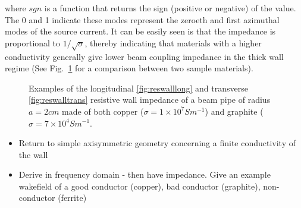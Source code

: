 where $sgn$ is a function that returns the sign (positive or negative) of the value. The 0 and 1 indicate these modes represent the zeroeth and first azimuthal modes of the source current. It can be easily seen is that the impedance is proportional to $1/ \sqrt{\sigma}$, thereby indicating that materials with a higher conductivity generally give lower beam coupling impedance in the thick wall regime (See Fig.~\ref{fig:resWallImpComp} for a comparison between two sample materials).

\begin{figure}
\subfigure[]{

\label{fig:reswalllong}
}
\subfigure[]{

\label{fig:reswalltrans}
}

\caption{Examples of the longitudinal \ref{fig:reswalllong} and transverse \ref{fig:reswalltrans} resistive wall impedance of a beam pipe of radius $a = 2cm$ made of both copper ($\sigma = 1 \times 10^{7} S m^{-1}$) and graphite ($\sigma = 7 \times 10^{4} S m^{-1}$.}
\label{fig:resWallImpComp}
\end{figure}

\begin{itemize}
\item{Return to simple axisymmetric geometry concerning a finite conductivity of the wall}
\item{Derive in frequency domain - then have impedance. Give an example wakefield of a good conductor (copper), bad conductor (graphite), non-conductor (ferrite)}
\end{itemize}